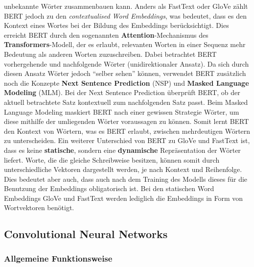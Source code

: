 \documentclass[11pt]{article}
\begin{document}
unbekannte Wörter zusammenbauen kann. Anders als FastText oder GloVe
zählt BERT jedoch zu den \emph{contextualised Word Embeddings}, was
bedeutet, dass es den Kontext eines Wortes bei der Bildung des
Embeddings berücksichtigt. Dies erreicht BERT durch den sogenannten
\textbf{Attention}-Mechanismus des \textbf{Transformers}-Modell, der es
erlaubt, relevanten Worten in einer Sequenz mehr Bedeutung als anderen
Worten zuzuschreiben. Dabei betrachtet BERT vorhergehende und
nachfolgende Wörter (unidirektionaler Ansatz). Da sich durch diesen
Ansatz Wörter jedoch ``selber sehen'' können, verwendet BERT zusätzlich
noch die Konzepte \textbf{Next Sentence Prediction} (NSP) und
\textbf{Masked Language Modeling} (MLM). Bei der Next Sentence
Prediction überprüft BERT, ob der aktuell betrachtete Satz kontextuell
zum nachfolgenden Satz passt. Beim Masked Language Modeling maskiert
BERT nach einer gewissen Strategie Wörter, um diese mithilfe der
umliegenden Wörter voraussagen zu können. Somit lernt BERT den Kontext
von Wörtern, was es BERT erlaubt, zwischen mehrdeutigen Wörtern zu
unterscheiden. Ein weiterer Unterschied von BERT zu GloVe und FastText
ist, dass es keine \textbf{statische}, sondern eine \textbf{dynamische}
Repräsentation der Wörter liefert. Worte, die die gleiche Schreibweise
besitzen, können somit durch unterschiedliche Vektoren dargestellt
werden, je nach Kontext und Reihenfolge. Dies bedeutet aber auch, dass
auch nach dem Training des Modells dieses für die Benutzung der
Embeddings obligatorisch ist. Bei den statischen Word Embeddings GloVe
und FastText werden lediglich die Embeddings in Form von Wortvektoren
benötigt.

    \hypertarget{convolutional-neural-networks}{%
\subsection{Convolutional Neural
Networks}\label{convolutional-neural-networks}}

\hypertarget{allgemeine-funktionsweise}{%
\subsubsection{Allgemeine
Funktionsweise}\label{allgemeine-funktionsweise}}
\end{document}
